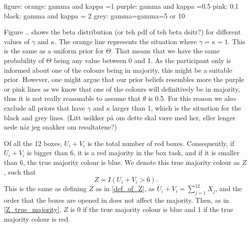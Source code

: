 figure: 
orange: gamma and kappa =1
purple: gamma and kappa =0.5 
pink: 0.1
black: gamma and kappa = 2
grey: gamma=gamma=5 or 10


Figure .. shows the beta distribution (or teh pdf of teh beta dsitr?) for different values of $\gamma$ and $\kappa$. The orange line represents the situation where $\gamma=\kappa=1$. This is the same as a uniform prior for $\Theta$. That means that we have the same probability of $\Theta$ being any value between 0 and 1. As the participant only is informed about one of the colours being in majority, this might be a suitable prior.
However, one might argue that our prior beliefs resembles more the purple or pink lines as we know that one of the colours will definitively be in majority, thus it is not really reasonable to assume that $\theta$ is 0.5. For this reason we also exclude all priors that have $\gamma$ and $\kappa$ larger than 1, which is the situation for the black and grey lines. (Litt usikker på om dette skal være med her, eller lenger nede når jeg snakker om resultatene?)



Of all the 12 boxes, $U_i+V_i$ is the total number of red boxes.
Consequently, if $U_i+V_i$ is bigger than 6, it is a red majority in the box task, and if it is smaller than 6, the true majority colour is blue. We denote this true majority colour as $Z$, such that
\begin{equation}
\label{def_of_Z_2}
    Z = I(U_i+V_i>6).
\end{equation}
This is the same as defining $Z$ as in \eqref{def_of_Z}, as $U_i+V_i = \sum_{j=1}^{12}X_j$, and the order that the boxes are opened in does not affect the majority. Then, as in \eqref{Z_true_majority}, $Z$ is 0 if the true majority colour is blue and 1 if the true majority colour is red. 



